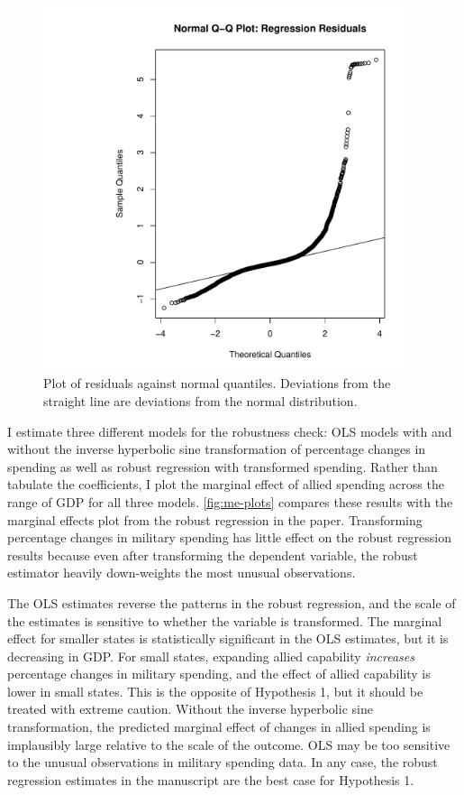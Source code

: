 \documentclass[12pt]{article}
\begin{document}
\begin{figure}[htbp]
	\centering
		\includegraphics[width=0.95\textwidth]{res-qq-plot.pdf}
	\caption{Plot of residuals against normal quantiles. Deviations from the straight line are deviations from the normal distribution.}
	\label{fig:res-qq-plot}
\end{figure}

I estimate three different models for the robustness check: OLS models with and without the inverse hyperbolic sine transformation of percentage changes in spending as well as robust regression with transformed spending. 
Rather than tabulate the coefficients, I plot the marginal effect of allied spending across the range of GDP for all three models.
\autoref{fig:me-plots} compares these results with the marginal effects plot from the robust regression in the paper. 
Transforming percentage changes in military spending has little effect on the robust regression results because even after transforming the dependent variable, the robust estimator heavily down-weights the most unusual observations. 


The OLS estimates reverse the patterns in the robust regression, and the scale of the estimates is sensitive to whether the variable is transformed. 
The marginal effect for smaller states is statistically significant in the OLS estimates, but it is decreasing in GDP. 
For small states, expanding allied capability \emph{increases} percentage changes in military spending, and the effect of allied capability is lower in small states. 
This is the opposite of Hypothesis 1, but it should be treated with extreme caution. 
Without the inverse hyperbolic sine transformation, the predicted marginal effect of changes in allied spending is implausibly large relative to the scale of the outcome. 
OLS may be too sensitive to the unusual observations in military spending data. 
In any case, the robust regression estimates in the manuscript are the best case for Hypothesis 1. 
\end{document}
